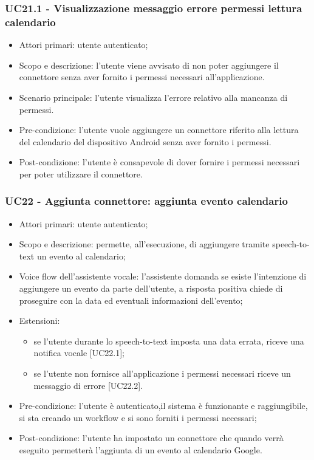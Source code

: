 \subsubsection{UC21.1 - Visualizzazione messaggio errore permessi lettura calendario}
\begin{itemize}
	\item  Attori primari: utente autenticato;
	\item  Scopo e descrizione: l'utente viene avvisato di non poter aggiungere il connettore senza aver fornito i permessi necessari all'applicazione.
	\item  Scenario principale: l'utente visualizza l'errore relativo alla mancanza di permessi.
	\item  Pre-condizione: l'utente vuole aggiungere un connettore riferito alla lettura del calendario del dispositivo Android senza aver fornito i permessi.
	\item  Post-condizione: l'utente è consapevole di dover fornire i permessi necessari per poter utilizzare il connettore.
\end{itemize}
\subsubsection{UC22 - Aggiunta connettore: aggiunta evento calendario}
\begin{itemize}
	\item  Attori primari: utente autenticato;
	\item  Scopo e descrizione: permette, all'esecuzione, di aggiungere tramite speech-to-text un evento al calendario;
	\item  Voice flow dell'assistente vocale: l'assistente domanda se esiste l'intenzione di aggiungere un evento da parte dell'utente, a risposta positiva chiede di proseguire con la data ed eventuali informazioni dell'evento;
	\item  Estensioni: 
		   \begin{itemize}
			    \item se l'utente durante lo speech-to-text imposta una data errata, riceve una notifica vocale [UC22.1];
				\item se l'utente non fornisce all'applicazione i permessi necessari riceve un messaggio di errore [UC22.2].
		   \end{itemize}
	\item  Pre-condizione: l'utente è autenticato,il sistema è funzionante e raggiungibile, si sta creando un workflow e si sono forniti i permessi necessari;
	\item  Post-condizione: l'utente ha impostato un connettore che quando verrà eseguito permetterà l'aggiunta di un evento al calendario Google.
\end{itemize}

